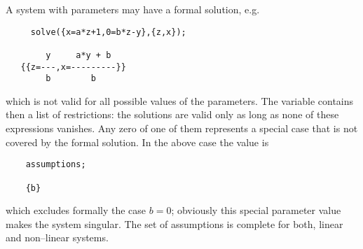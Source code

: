 A system  with parameters may have a formal solution, e.g.\
\begin{verbatim}
     solve({x=a*z+1,0=b*z-y},{z,x});

        y     a*y + b
   {{z=---,x=---------}}
        b        b
\end{verbatim}
which is not valid for all possible values of the parameters.
\hypertarget{reserved:assumptions}{}
The variable 
contains then a list of
restrictions: the solutions are valid only as long
as none of these expressions vanishes. Any zero of one of them
represents a special case that is not covered by the
formal solution. In the above case the value is
\begin{verbatim}
    assumptions;

    {b}
\end{verbatim}
which excludes formally the case $b=0$; obviously this special 
parameter value makes the system singular. The set of assumptions
is complete for both, linear and non--linear systems.
    
